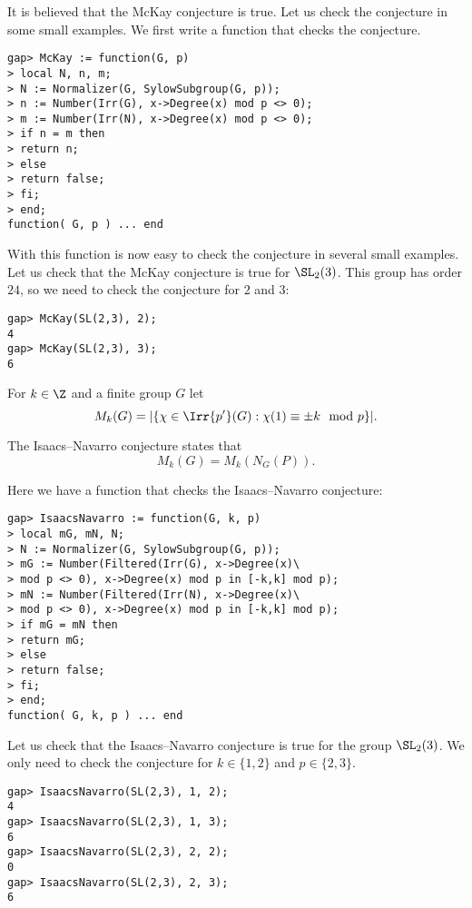 \begin{example}
It is believed that the McKay conjecture is true.  Let us check the conjecture
in some small examples. We first write a function that checks the conjecture.

\begin{lstlisting}
gap> McKay := function(G, p)
> local N, n, m;
> N := Normalizer(G, SylowSubgroup(G, p));
> n := Number(Irr(G), x->Degree(x) mod p <> 0);
> m := Number(Irr(N), x->Degree(x) mod p <> 0);
> if n = m then
> return n;
> else
> return false;
> fi;
> end;
function( G, p ) ... end
\end{lstlisting}
With this function is now easy to check the conjecture in several small
examples. Let us check that the McKay conjecture is true for $\SL_2(3)$. This
group has order $24$, so we need to check the conjecture for $2$ and $3$: 
\begin{lstlisting}
gap> McKay(SL(2,3), 2);
4
gap> McKay(SL(2,3), 3);
6
\end{lstlisting}
\end{example}

For $k\in\Z$ and a finite group $G$ let
\[
  M_k(G)=|\{\chi\in\Irr{p'}(G):\chi(1)\equiv\pm k\mod p\}|.
\]

The Isaacs--Navarro conjecture states that 
\[
    M_k(G)=M_k(N_G(P)).
\]

\begin{example}
Here we have a function that checks the Isaacs--Navarro conjecture:
\begin{lstlisting}
gap> IsaacsNavarro := function(G, k, p)
> local mG, mN, N;
> N := Normalizer(G, SylowSubgroup(G, p));
> mG := Number(Filtered(Irr(G), x->Degree(x)\
> mod p <> 0), x->Degree(x) mod p in [-k,k] mod p);
> mN := Number(Filtered(Irr(N), x->Degree(x)\
> mod p <> 0), x->Degree(x) mod p in [-k,k] mod p);
> if mG = mN then
> return mG;
> else
> return false;
> fi;
> end;
function( G, k, p ) ... end
\end{lstlisting}

Let us check that the Isaacs--Navarro conjecture is true for the group
$\SL_2(3)$. We only need to check the conjecture for $k\in\{1,2\}$ and
$p\in\{2,3\}$. 
\begin{lstlisting}
gap> IsaacsNavarro(SL(2,3), 1, 2);
4
gap> IsaacsNavarro(SL(2,3), 1, 3);
6
gap> IsaacsNavarro(SL(2,3), 2, 2);
0
gap> IsaacsNavarro(SL(2,3), 2, 3);
6
\end{lstlisting}
\end{example}

